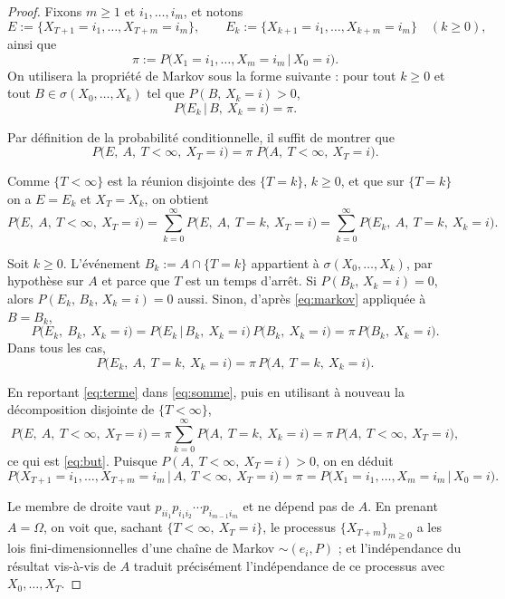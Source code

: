 \begin{proof}
Fixons $m\ge1$ et $i_1,\dots,i_m$, et notons
\[
E:=\{X_{T+1}=i_1,\dots,X_{T+m}=i_m\},\qquad
E_k:=\{X_{k+1}=i_1,\dots,X_{k+m}=i_m\}\quad(k\ge0),
\]
ainsi que
\[
\pi:=P\big(X_1=i_1,\dots,X_m=i_m \,\big|\, X_0=i\big).
\]
On utilisera la propriété de Markov sous la forme suivante : pour tout $k\ge0$ et tout $B\in\sigma(X_0,\dots,X_k)$ tel que $P(B,\,X_k=i)>0$,
\begin{equation}\label{eq:markov}
P\big(E_k \,\big|\, B,\ X_k=i\big)=\pi .
\end{equation}

Par définition de la probabilité conditionnelle, il suffit de montrer que
\begin{equation}\label{eq:but}
P\big(E,\ A,\ T<\infty,\ X_T=i\big)=\pi\;P\big(A,\ T<\infty,\ X_T=i\big).
\end{equation}

Comme $\{T<\infty\}$ est la réunion disjointe des $\{T=k\}$, $k\ge0$, et que sur $\{T=k\}$ on a $E=E_k$ et $X_T=X_k$, on obtient
\begin{equation}\label{eq:somme}
P\big(E,\ A,\ T<\infty,\ X_T=i\big)
=\sum_{k=0}^{\infty}P\big(E,\ A,\ T=k,\ X_T=i\big)
=\sum_{k=0}^{\infty}P\big(E_k,\ A,\ T=k,\ X_k=i\big).
\end{equation}

Soit $k\ge0$. L'événement $B_k:=A\cap\{T=k\}$ appartient à $\sigma(X_0,\dots,X_k)$, par hypothèse sur $A$ et parce que $T$ est un temps d'arrêt. Si $P(B_k,\,X_k=i)=0$, alors $P(E_k,\,B_k,\,X_k=i)=0$ aussi. Sinon, d'après \eqref{eq:markov} appliquée à $B=B_k$,
\[
P\big(E_k,\ B_k,\ X_k=i\big)
=P\big(E_k\,\big|\,B_k,\ X_k=i\big)\,P\big(B_k,\ X_k=i\big)
=\pi\,P\big(B_k,\ X_k=i\big).
\]
Dans tous les cas,
\begin{equation}\label{eq:terme}
P\big(E_k,\ A,\ T=k,\ X_k=i\big)=\pi\,P\big(A,\ T=k,\ X_k=i\big).
\end{equation}

En reportant \eqref{eq:terme} dans \eqref{eq:somme}, puis en utilisant à nouveau la décomposition disjointe de $\{T<\infty\}$,
\[
P\big(E,\ A,\ T<\infty,\ X_T=i\big)
=\pi\sum_{k=0}^{\infty}P\big(A,\ T=k,\ X_k=i\big)
=\pi\,P\big(A,\ T<\infty,\ X_T=i\big),
\]
ce qui est \eqref{eq:but}. Puisque $P(A,\ T<\infty,\ X_T=i)>0$, on en déduit
\[
P\big(X_{T+1}=i_1,\dots,X_{T+m}=i_m \,\big|\, A,\ T<\infty,\ X_T=i\big)
=\pi
=P\big(X_1=i_1,\dots,X_m=i_m \,\big|\, X_0=i\big).
\]

Le membre de droite vaut $p_{ii_1}p_{i_1i_2}\cdots p_{i_{m-1}i_m}$ et ne dépend pas de $A$. En prenant $A=\Omega$, on voit que, sachant $\{T<\infty,\ X_T=i\}$, le processus $\{X_{T+m}\}_{m\ge0}$ a les lois fini-dimensionnelles d'une chaîne de Markov $\sim(e_i,P)$ ; et l'indépendance du résultat vis-à-vis de $A$ traduit précisément l'indépendance de ce processus avec $X_0,\dots,X_T$.
\end{proof}

